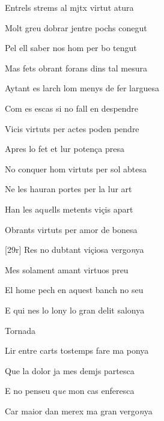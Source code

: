 \documentclass[12pt]{article}
\begin{document}
\begin{estrofa}

 Entrels strems al mjtx virtut atura

 Molt greu dobrar jentre pochs conegut

 Pel ell saber nos hom per bo tengut

 Mas fets obrant forans dins tal mesura

 Aytant es larch lom menys de fer larguesa

 Com es escas si no fall en despendre

 Vicis virtuts per actes poden pendre

 Apres lo fet et lur poten\c{c}a presa

\end{estrofa}



\begin{estrofa}

 No conquer hom virtuts per sol abtesa

 Ne les hauran portes per la lur art

 Han les aq\textit{ue}lls metents vi\c{c}is apart

 Obrants virtuts per amor de bonesa

 [29r] Res no dubtant vi\c{c}iosa vergo\textit{n}ya

 Mes solament amant virtuos preu

 El home pech en aquest banch no seu

 E qui nes lo lony lo gran delit salonya

\end{estrofa}


\begin{estrofaExtra}%




\begin{tornada}

Tornada

\end{tornada}


\end{estrofaExtra}


\begin{estrofa}

 Lir entre carts tostemps fare ma ponya

 Que la dolor ja mes demjs partesca

 E no penseu q\textit{ue} mon cas enferesca

 Car maior dan merex ma gran vergo\textit{n}ya

\end{estrofa}
\end{document}
